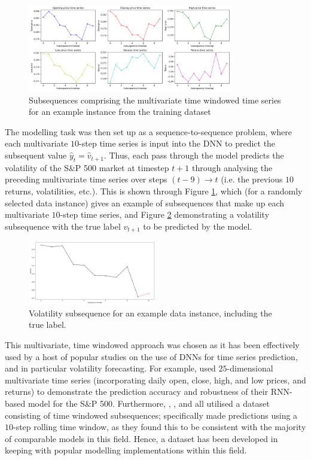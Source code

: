 \documentclass[a4paper, 11pt]{report}
\begin{document}
    \begin{figure}[ht]
        \centering
        \includegraphics[width=0.8\textwidth]{subsequences.png}
        \caption{\centering Subsequences comprising the multivariate time windowed time series for an example instance from the training dataset}
        \label{fig: subsequences}
    \end{figure}


    The modelling task was then set up as a sequence-to-sequence problem, where each multivariate $10$-step time series is input into the DNN to predict the subsequent value $\hat{y}_t = \hat{v}_{t+1}$. Thus, each pass through the model predicts the volatility of the S\&P 500 market at timestep $t+1$ through analysing the preceding multivariate time series over steps $(t-9) \to t$ (i.e. the previous $10$ returns, volatilities, etc.). This is shown through Figure \ref{fig: subsequences}, which (for a randomly selected data instance) gives an example of subsequences that make up each multivariate $10$-step time series, and Figure \ref{fig: volatility-subsequence} demonstrating a volatility subsequence with the true label $v_{t+1}$ to be predicted by the model.


    \begin{figure}[ht]
        \centering
        \includegraphics[width=0.5\textwidth]{volatility-subsequence.png}
        \caption{\centering Volatility subsequence for an example data instance, including the true label.}
        \label{fig: volatility-subsequence}
    \end{figure}


    This multivariate, time windowed approach was chosen as it has been effectively used by a host of popular studies on the use of DNNs for time series prediction, and in particular volatility forecasting. For example, \citet{xiong-2016} used $25$-dimensional multivariate time series (incorporating daily open, close, high, and low prices, and returns) to demonstrate the prediction accuracy and robustness of their RNN-based model for the S\&P 500. Furthermore, \citet{xiong-2016}, \citet{bucci-2020}, and \citet{rodikov-2022} all utilised a dataset consisting of time windowed subsequences; \citet{xiong-2016} specifically made predictions using a $10$-step rolling time window, as they found this to be consistent with the majority of comparable models in this field. Hence, a dataset has been developed in keeping with popular modelling implementations within this field.
\end{document}
